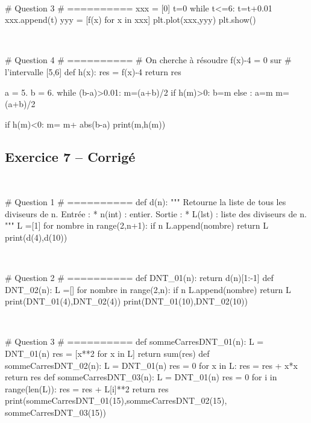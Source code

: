 \documentclass[10pt,fleqn]{article} %
\begin{document}
\begin{corrige}
$\quad$
\begin{python}
# Question 3
# ==========
xxx = [0]
t=0
while t<=6:
    t=t+0.01
    xxx.append(t)
yyy = [f(x) for x in xxx]
plt.plot(xxx,yyy)
plt.show()
\end{python}
\end{corrige}


\begin{corrige}
$\quad$
\begin{python}
# Question 4
# ==========
# On cherche à résoudre f(x)-4 = 0 sur
# l'intervalle [5,6]
def h(x):
    res = f(x)-4
    return res

a = 5.
b = 6.
while (b-a)>0.01:
    m=(a+b)/2
    if h(m)>0:
        b=m
    else :
        a=m
m=(a+b)/2

if h(m)<0:
    m= m+ abs(b-a)
print(m,h(m))
\end{python}
\end{corrige}
 

\subsection*{Exercice 7 -- Corrigé}

\begin{corrige}
$\quad$
\begin{python}
# Question 1 
# ==========
def d(n):
    """
    Retourne la liste de tous les diviseurs de n.
    Entrée : 
     * n(int) : entier.
    Sortie : 
     * L(lst) : liste des diviseurs de n.
    """
    L =[1]
    for nombre in range(2,n+1):
        if n%
            L.append(nombre)
    return L
print(d(4),d(10))
\end{python}
\end{corrige}

\begin{corrige}
$\quad$
\begin{python}
# Question 2 
# ==========
def DNT_01(n):
    return d(n)[1:-1]
def DNT_02(n):
    L =[]
    for nombre in range(2,n):
        if n%
            L.append(nombre)
    return L
print(DNT_01(4),DNT_02(4))
print(DNT_01(10),DNT_02(10))
\end{python}
\end{corrige}


\begin{corrige}
$\quad$
\begin{python}
# Question 3
# ==========
def sommeCarresDNT_01(n):
    L = DNT_01(n)
    res = [x**2 for x in L]
    return sum(res)
def sommeCarresDNT_02(n):
    L = DNT_01(n)
    res = 0
    for x in L:
        res = res + x*x
    return res
def sommeCarresDNT_03(n):
    L = DNT_01(n)
    res = 0
    for i in range(len(L)):
        res = res + L[i]**2
    return res
print(sommeCarresDNT_01(15),sommeCarresDNT_02(15),
    sommeCarresDNT_03(15))
\end{python}
\end{corrige}
\end{document}
